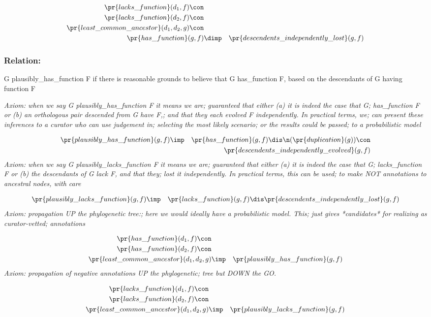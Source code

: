 \begin{eqnarray*}
 \pr{lacks\_function}(d_1, f) \con \\
 \pr{lacks\_function}(d_2, f) \con \\
 \pr{least\_common\_ancestor}(d_1, d_2, g) \con \\
 \pr{has\_function}(g, f) &\dimp & \pr{descendents\_independently\_lost}(g, f) 
\end{eqnarray*}
\subsubsection{Relation:  }


G plausibly\_has\_function F if
there is reasonable grounds to believe that G has\_function F, based on
the descendants of G having function F

\emph{Axiom: when we say G plausibly\_has\_function F it means we are; guaranteed that either (a) it is indeed the case that G; has\_function F or (b) an orthologous pair descended from G have F,; and that they each evolved F independently. In practical terms, we; can present these inferences to a curator who can use judgement in; selecting the most likely scenario; or the results could be passed; to a probabilistic model}

\begin{eqnarray*}
 \pr{plausibly\_has\_function}(g, f) &\imp & \pr{has\_function}(g, f) \dis  \n( \pr{duplication}(g) )\con \\
&& \pr{descendents\_independently\_evolved}(g, f) 
\end{eqnarray*}
\emph{Axiom: when we say G plausibly\_lacks\_function F it means we are; guaranteed that either (a) it is indeed the case that G; lacks\_function F or (b) the descendants of G lack F, and that they; lost it independently. In practical terms, this can be used; to make NOT annotations to ancestral nodes, with care}

\begin{eqnarray*}
 \pr{plausibly\_lacks\_function}(g, f) &\imp & \pr{lacks\_function}(g, f) \dis  \pr{descendents\_independently\_lost}(g, f) 
\end{eqnarray*}
\emph{Axiom: propagation UP the phylogenetic tree:; here we would ideally have a probabilistic model. This; just gives *candidates* for realizing as curator-vetted; annotations}

\begin{eqnarray*}
 \pr{has\_function}(d_1, f) \con \\
 \pr{has\_function}(d_2, f) \con \\
 \pr{least\_common\_ancestor}(d_1, d_2, g) &\imp & \pr{plausibly\_has\_function}(g, f) 
\end{eqnarray*}
\emph{Axiom: propagation of negative annotations UP the phylogenetic; tree but DOWN the GO.}

\begin{eqnarray*}
 \pr{lacks\_function}(d_1, f) \con \\
 \pr{lacks\_function}(d_2, f) \con \\
 \pr{least\_common\_ancestor}(d_1, d_2, g) &\imp & \pr{plausibly\_lacks\_function}(g, f) 
\end{eqnarray*}
